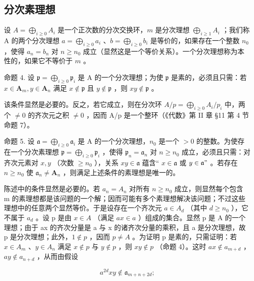\subsection{分次素理想}

设 \(A = \bigoplus_{i \geqslant 0} A_i\) 是一个正次数的分次交换环，\(m\) 是分次理想 \(\bigoplus_{i \geqslant 1} A_i\) ；我们称 A 的两个分次理想 \(a = \bigoplus_{i \geqslant 0} a_i\) 、\(b = \bigoplus_{i \geqslant 0} b_i\) 是等价的，如果存在一个整数 \(n_0\) ，使得 \(a_n = b_n\) 对 \(n \geqslant n_0\) 成立（显然这是一个等价关系）。一个分次理想称为本性的，如果它不等价于 \(m\) 。

命题 4. 设 \(\mathfrak{p} = \bigoplus_{i\geqslant 0}\mathfrak{p}_i\) 是 A 的一个分次理想；为使 \(\mathfrak{p}\) 是素的，必须且只需：若 \(x\in \mathbf{A}_m,y\in \mathbf{A}_n\) 满足 \(x\notin \mathfrak{p}\) 且 \(y\notin \mathfrak{p}\) ，则 \(xy\notin \mathfrak{p}\) 。

该条件显然是必要的。反之，若它成立，则在分次环 \(A/p = \bigoplus_{i \geq 0} A_i/p_i\) 中，两个 \(\neq 0\) 的齐次元之积 \(\neq 0\) ，因而 A/p 是一个整环（《代数》第 II 章 §11 第 4 节命题 7）。

命题 5. 设 \(\mathfrak{a} = \bigoplus_{i\geqslant 0}\mathfrak{a}_i\) 是 A 的一个分次理想，\(n_0\) 是一个 \(>0\) 的整数。为使存在一个分次素理想 \(\mathfrak{p} = \bigoplus_{i\geqslant 0}\mathfrak{p}_i\) ，使得 \(\mathfrak{p}_n = \mathfrak{a}_n\) 对 \(n\geqslant n_0\) 成立，必须且只需：对齐次元素对 \(x,y\) （次数 \(\geqslant n_0\) ），关系 \(xy\in \mathfrak{a}\) 蕴含“ \(x\in \mathfrak{a}\) 或 \(y\in \mathfrak{a}"\) 。若存在 \(n\geqslant n_0\) 使 \(\mathfrak{a}_n\neq \mathbf{A}_n\) ，则满足上述条件的素理想是唯一的。

陈述中的条件显然是必要的。若 \(a_{n} = A_{n}\) 对所有 \(n \geqslant n_{0}\) 成立，则显然每个包含 m 的素理想都是该问题的一个解；因而可能有多个素理想解决该问题；不过这些理想中的任意两个显然等价。于是设存在一个齐次元 \(a \in A_{d}\) （其中 \(d \geqslant n_{0}\) ），它不属于 \(a_{d}\) 。设 p 是由 \(x \in A\) （满足 \(ax \in a\) ）组成的集合。显然 p 是 A 的一个理想；由于 ax 的齐次分量是 a 与 x 的诸齐次分量的乘积，且 a 是分次理想，故 p 是分次理想；此外，\(1 \notin p\) ，因而 \(p \neq A\) 。为证明 p 是素的，只需证明：若 \(x \in A_{m}\) 、\(y \in A_{n}\) 满足 \(x \notin p\) 与 \(y \notin p\) ，则 \(xy \notin p\) （命题 4）。这时 \(ax \notin a_{m+d}\) ，\(ay \notin a_{n+d}\) ，从而由假设

\[
a ^ {2d} x y \notin \mathfrak {a} _ {m + n + 2 d};
\]


